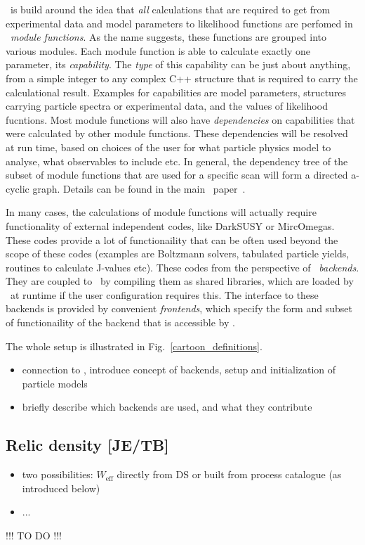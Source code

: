 \GB\ is build around the idea that \emph{all} calculations that are required to
get from experimental data and model parameters to likelihood functions are
perfomed in \GB\ \emph{module functions}.  As the name suggests, these
functions are grouped into various modules.  Each module function is able to
calculate exactly one parameter, its \emph{capability}.  The \emph{type} of
this capability can be just about anything, from a simple integer to any
complex C++ structure that is required to carry the calculational result.
Examples for capabilities are model parameters, structures carrying particle
spectra or experimental data, and the values of likelihood fucntions.  Most
module functions will also have \emph{dependencies} on capabilities that were
calculated by other module functions.  These dependencies will be resolved at
run time, based on choices of the user for what particle physics model to
analyse, what observables to include etc.  In general, the dependency tree of
the subset of module functions that are used for a specific scan will form a
directed a-cyclic graph.  Details can be found in the main \GB\
paper~\cite{123}.

In many cases, the calculations of module functions will actually require
functionality of external independent codes, like DarkSUSY or MircOmegas.
These codes provide a lot of functionaility that can be often used beyond the
scope of these codes (examples are Boltzmann solvers, tabulated particle
yields, routines to calculate J-values etc).  These codes from the perspective
of \GB\ \emph{backends}.  They are coupled to \GB\ by compiling them as shared
libraries, which are loaded by \GB\ at runtime if the user configuration
requires this.  The interface to these backends is provided by convenient
\emph{frontends}, which specify the form and subset of functionaility of the
backend that is accessible by \GB.

The whole setup is illustrated in Fig.~\ref{cartoon_definitions}.

\begin{itemize}
  \item connection to \GB, introduce concept of backends, setup and
    initialization of particle models
  \item briefly describe which backends are used, and what they contribute 
\end{itemize}

\subsection{Relic density {\bf [JE/TB]}}
\label{code_rd}
\begin{itemize}
  \item two possibilities: $W_\mathrm{eff}$ directly from DS or built from
    process catalogue (as introduced below)
  \item...
\end{itemize}
\smallskip
{\color{red} !!! TO DO !!!}
\smallskip



